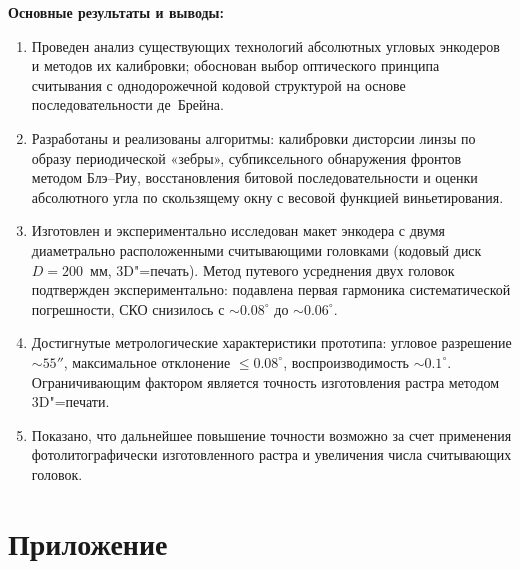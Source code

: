 \textbf{Основные результаты и выводы:}
\begin{enumerate}
    \item Проведен анализ существующих технологий абсолютных угловых энкодеров и методов их калибровки; обоснован выбор оптического принципа считывания с однодорожечной кодовой структурой на основе последовательности де~Брейна.

    \item Разработаны и реализованы алгоритмы: калибровки дисторсии линзы по образу периодической «зебры», субпиксельного обнаружения фронтов методом Блэ--Риу, восстановления битовой последовательности и оценки абсолютного угла по скользящему окну с весовой функцией виньетирования.

    \item Изготовлен и экспериментально исследован макет энкодера с двумя диаметрально расположенными считывающими головками (кодовый диск $D=200$~мм, 3D"=печать). Метод путевого усреднения двух головок подтвержден экспериментально: подавлена первая гармоника систематической погрешности, СКО снизилось с $\sim 0.08^\circ$ до $\sim 0.06^\circ$.

    \item Достигнутые метрологические характеристики прототипа: угловое разрешение $\sim 55''$, максимальное отклонение $\leq 0.08^\circ$, воспроизводимость $\sim 0.1^\circ$. Ограничивающим фактором является точность изготовления растра методом 3D"=печати.

    \item Показано, что дальнейшее повышение точности возможно за счет применения фотолитографически изготовленного растра и увеличения числа считывающих головок.
\end{enumerate}

\section*{Приложение}


